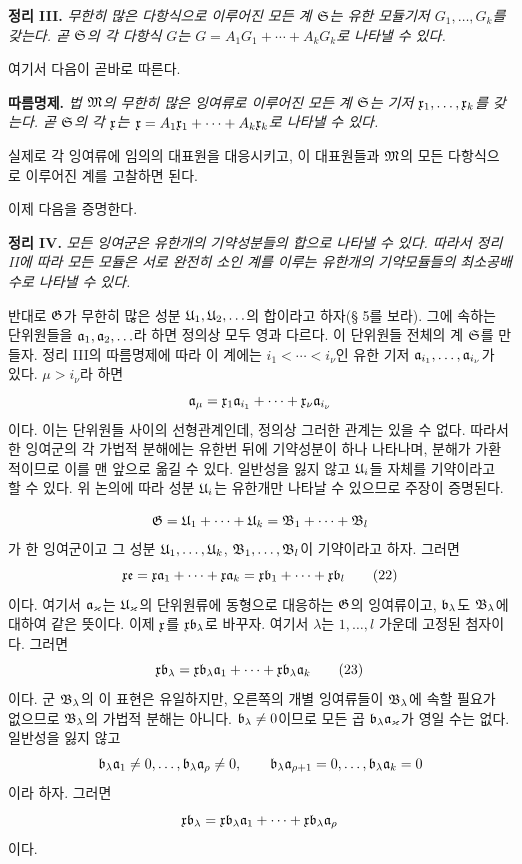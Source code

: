 \textbf{정리 III.} \emph{무한히 많은 다항식으로 이루어진 모든 계 \(\mathfrak S\)는 유한 모듈기저 \(G_1,\ldots,G_k\)를 갖는다. 곧 \(\mathfrak S\)의 각 다항식 \(G\)는 \(G=A_1G_1+\cdots+A_kG_k\)로 나타낼 수 있다.}

여기서 다음이 곧바로 따른다.

\textbf{따름명제.} \emph{법 \(\mathfrak M\)의 무한히 많은 잉여류로 이루어진 모든 계 \(\mathfrak S\)는 기저 \(\mathfrak x_1,\ldots,\mathfrak x_k\)를 갖는다. 곧 \(\mathfrak S\)의 각 \(\mathfrak x\)는 \(\mathfrak x=A_1\mathfrak x_1+\cdots+A_k\mathfrak x_k\)로 나타낼 수 있다.}

실제로 각 잉여류에 임의의 대표원을 대응시키고, 이 대표원들과 \(\mathfrak M\)의 모든 다항식으로 이루어진 계를 고찰하면 된다.

이제 다음을 증명한다.

\textbf{정리 IV.} \emph{모든 잉여군은 유한개의 기약성분들의 합으로 나타낼 수 있다. 따라서 정리 II에 따라 모든 모듈은 서로 완전히 소인 계를 이루는 유한개의 기약모듈들의 최소공배수로 나타낼 수 있다.}

반대로 \(\mathfrak G\)가 무한히 많은 성분 \(\mathfrak U_1,\mathfrak U_2,\ldots\)의 합이라고 하자(§ 5를 보라). 그에 속하는 단위원들을 \(\mathfrak{a}_1,\mathfrak{a}_2,\ldots\)라 하면 정의상 모두 영과 다르다. 이 단위원들 전체의 계 \(\mathfrak S\)를 만들자. 정리 III의 따름명제에 따라 이 계에는 \(i_1<\cdots<i_\nu\)인 유한 기저 \(\mathfrak{a}_{i_1},\ldots,\mathfrak{a}_{i_\nu}\)가 있다. \(\mu>i_\nu\)라 하면
\[
 \mathfrak{a}_\mu=\mathfrak x_1\mathfrak{a}_{i_1}+\cdots+\mathfrak x_\nu\mathfrak{a}_{i_\nu}
\]
이다. 이는 단위원들 사이의 선형관계인데, 정의상 그러한 관계는 있을 수 없다. 따라서 한 잉여군의 각 가법적 분해에는 유한번 뒤에 기약성분이 하나 나타나며, 분해가 가환적이므로 이를 맨 앞으로 옮길 수 있다. 일반성을 잃지 않고 \(\mathfrak U_i\)들 자체를 기약이라고 할 수 있다. 위 논의에 따라 성분 \(\mathfrak U_i\)는 유한개만 나타날 수 있으므로 주장이 증명된다.


\[
 \mathfrak G=\mathfrak U_1+\cdots+\mathfrak U_k=\mathfrak B_1+\cdots+\mathfrak B_l
\]
가 한 잉여군이고 그 성분 \(\mathfrak U_1,\ldots,\mathfrak U_k\), \(\mathfrak B_1,\ldots,\mathfrak B_l\)이 기약이라고 하자. 그러면
\begin{equation}
 \mathfrak x\mathfrak e=\mathfrak x\mathfrak{a}_1+\cdots+\mathfrak x\mathfrak{a}_k
       =\mathfrak x\mathfrak{b}_1+\cdots+\mathfrak x\mathfrak{b}_l
\tag{22}
\end{equation}
이다. 여기서 \(\mathfrak{a}_\varkappa\)는 \(\mathfrak U_\varkappa\)의 단위원류에 동형으로 대응하는 \(\mathfrak G\)의 잉여류이고, \(\mathfrak{b}_\lambda\)도 \(\mathfrak B_\lambda\)에 대하여 같은 뜻이다. 이제 \(\mathfrak x\)를 \(\mathfrak x\mathfrak{b}_\lambda\)로 바꾸자. 여기서 \(\lambda\)는 \(1,\ldots,l\) 가운데 고정된 첨자이다. 그러면
\begin{equation}
 \mathfrak x\mathfrak{b}_\lambda
 =\mathfrak x\mathfrak{b}_\lambda\mathfrak{a}_1+\cdots+\mathfrak x\mathfrak{b}_\lambda\mathfrak{a}_k
\tag{23}
\end{equation}
이다. 군 \(\mathfrak B_\lambda\)의 이 표현은 유일하지만, 오른쪽의 개별 잉여류들이 \(\mathfrak B_\lambda\)에 속할 필요가 없으므로 \(\mathfrak B_\lambda\)의 가법적 분해는 아니다. \(\mathfrak{b}_\lambda\ne0\)이므로 모든 곱 \(\mathfrak{b}_\lambda\mathfrak{a}_\varkappa\)가 영일 수는 없다. 일반성을 잃지 않고
\[
 \mathfrak{b}_\lambda\mathfrak{a}_1\ne0,\ldots,\mathfrak{b}_\lambda\mathfrak{a}_\rho\ne0,\qquad
 \mathfrak{b}_\lambda\mathfrak{a}_{\rho+1}=0,\ldots,\mathfrak{b}_\lambda\mathfrak{a}_k=0
\]
이라 하자. 그러면
\[
 \mathfrak x\mathfrak{b}_\lambda
 =\mathfrak x\mathfrak{b}_\lambda\mathfrak{a}_1+\cdots+\mathfrak x\mathfrak{b}_\lambda\mathfrak{a}_\rho
\]
이다.

